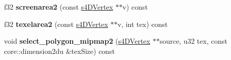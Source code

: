 \begin{DoxyCompactItemize}
\item 
\hypertarget{classirr_1_1video_1_1_c_burning_video_driver_ade489f2da3ee1a3f1b25b876edb85167}{f32 {\bfseries screenarea2} (const \hyperlink{structirr_1_1video_1_1s4_d_vertex}{s4\-D\-Vertex} $\ast$$\ast$v) const }\label{classirr_1_1video_1_1_c_burning_video_driver_ade489f2da3ee1a3f1b25b876edb85167}

\item 
\hypertarget{classirr_1_1video_1_1_c_burning_video_driver_a0a0e232ed7bd0141dbd1cae6bf167e8b}{f32 {\bfseries texelarea2} (const \hyperlink{structirr_1_1video_1_1s4_d_vertex}{s4\-D\-Vertex} $\ast$$\ast$v, int tex) const }\label{classirr_1_1video_1_1_c_burning_video_driver_a0a0e232ed7bd0141dbd1cae6bf167e8b}

\item 
\hypertarget{classirr_1_1video_1_1_c_burning_video_driver_a4de285bb841189e0faa1dab0ec94fade}{void {\bfseries select\-\_\-polygon\-\_\-mipmap2} (\hyperlink{structirr_1_1video_1_1s4_d_vertex}{s4\-D\-Vertex} $\ast$$\ast$source, u32 tex, const core\-::dimension2du \&tex\-Size) const }\label{classirr_1_1video_1_1_c_burning_video_driver_a4de285bb841189e0faa1dab0ec94fade}

\end{DoxyCompactItemize}
